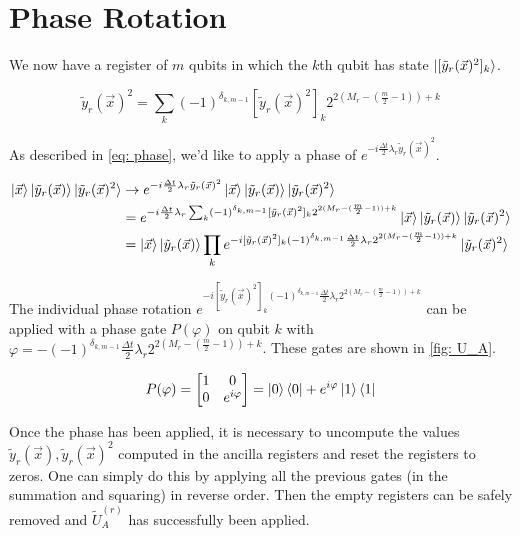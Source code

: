 \section{Phase Rotation}

We now have a register of $m$ qubits in which the $k$th qubit has state $\ket{[\tilde{y}_r(\vec{x})^2]_k}$.

\begin{equation}
    \tilde{y}_r(\vec{x})^2 = \sum_k (-1)^{\delta_{k, m - 1}}[\tilde{y}_r(\vec{x})^2]_k2^{2(M_r - (\frac{m}{2} - 1)) + k}
\end{equation}

As described in \eqref{eq: phase}, we'd like to apply a phase of $e^{-i\frac{\Delta t}{2}\lambda_r\tilde{y}_r(\vec{x})^2}$.

\begin{equation}
    \begin{split}
        \ket{\vec{x}}\ket{\tilde{y}_r(\vec{x})}\ket{\tilde{y}_r(\vec{x})^2} &\rightarrow e^{-i\frac{\Delta t}{2}\lambda_r\tilde{y}_r(\vec{x})^2}\ket{\vec{x}}\ket{\tilde{y}_r(\vec{x})}\ket{\tilde{y}_r(\vec{x})^2} \\
        &= e^{-i\frac{\Delta t}{2}\lambda_r\sum_k (-1)^{\delta_{k, m - 1}}[\tilde{y}_r(\vec{x})^2]_k2^{2(M_r - (\frac{m}{2} - 1)) + k}}\ket{\vec{x}}\ket{\tilde{y}_r(\vec{x})}\ket{\tilde{y}_r(\vec{x})^2}\\
        &= \ket{\vec{x}}\ket{\tilde{y}_r(\vec{x})}\prod_k e^{-i[\tilde{y}_r(\vec{x})^2]_k(-1)^{\delta_{k, m - 1}}\frac{\Delta t}{2}\lambda_r2^{2(M_r - (\frac{m}{2} - 1)) + k}}\ket{\tilde{y}_r(\vec{x})^2}
    \end{split}
\end{equation}

The individual phase rotation $e^{-i[\tilde{y}_r(\vec{x})^2]_k(-1)^{\delta_{k, m - 1}}\frac{\Delta t}{2}\lambda_r2^{2(M_r - (\frac{m}{2} - 1)) + k}}$ can be applied with a phase gate $P(\varphi)$ on qubit $k$ with $\varphi = -(-1)^{\delta_{k, m - 1}}\frac{\Delta t}{2}\lambda_r2^{2(M_r - (\frac{m}{2} - 1)) + k}$. These gates are shown in \ref{fig: U_A}.

\begin{equation}
    P(\varphi) = \begin{bmatrix}
        1 & 0 \\ 0 & e^{i\varphi}
    \end{bmatrix} = \ket{0}\bra{0} + e^{i\varphi}\ket{1}\bra{1}
\end{equation}

Once the phase has been applied, it is necessary to uncompute the values $\tilde{y}_r(\vec{x}), \tilde{y}_r(\vec{x})^2$ computed in the ancilla registers and reset the registers to zeros. One can simply do this by applying all the previous gates (in the summation and squaring) in reverse order. Then the empty registers can be safely removed and $\tilde{U}_A^{(r)}$ has successfully been applied.

